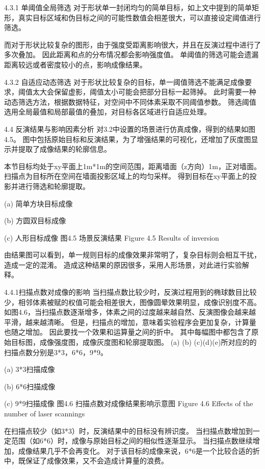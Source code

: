 4.3.1 单阈值全局筛选
对于形状单一封闭均匀的简单目标，如上文中提到的简单矩形，真实目标区域和伪目标之间的可能性数值会相差很大，可以直接设定阈值进行筛选。

而对于形状比较复杂的图形，由于强度受距离影响很大，并且在反演过程中进行了多次叠加。
因此距离和点的分布情况都会影响强度值。
单阈值的筛选可能会遗漏距离较远或者密度较小的点，影响成像结果。

4.3.2 自适应动态筛选
对于形状比较复杂的目标，单一阈值筛选不能满足成像要求，阈值太大会保留虚影，阈值太小可能会把部分目标一起筛掉。
此时需要一种动态筛选方法，根据数据特征，对空间中不同体素采取不同阈值参数。
筛选阈值选用全局最值和局部最值的叠加，对目标各区域进行自适应处理。

4.4  反演结果与影响因素分析
对3.2中设置的场景进行仿真成像，得到的结果如图4.5。
图中包括原始目标和反演结果，为了增强结果的可视化，还增加了灰度图显示并提取了成像结果的轮廓信息。

本节目标均处于xy平面上1m*1m的空间范围，距离墙面（z方向）1m，正对墙面。
扫描点为目标所在空间在墙面投影区域上的均匀采样。
得到目标在xy平面上的投影并进行筛选和轮廓提取。

 
(a) 简单方块目标成像
 
(b) 方圆双目标成像
 
(c) 人形目标成像
图4.5  场景反演结果
Figure 4.5 Results of inversion

由结果图可以看到，单一规则目标的成像效果非常明了，复杂目标则会相互干扰，造成一定的混淆。
造成这种结果的原因很多，采用人形场景，对此进行实验解释。

4.4.1扫描点数对成像的影响
当扫描点数比较少时，反演过程用到的椭球数目比较少，相邻体素被赋的权值可能会相差很大，图像圆晕效果明显，成像识别度不高。
如图4.6，当扫描点数逐渐增多，体素之间的过度越来越自然、反演图像会越来越平滑，越来越清晰。
但是，扫描点的增加，意味着实验程序会更加复杂，计算量也随之增加。
因此要找一个效果和运算量之间的折中。
其中每幅图中都包含了原始目标图，成像强度图，成像灰度图和轮廓提取图。
(a) (b) (c)(d)(e)所对应的的扫描点数分别是3*3，6*6，9*9。


 
(a) 3*3扫描成像
 
(b) 6*6扫描成像

 
(c) 9*9扫描成像
图4.6 扫描点数对成像结果影响示意图
Figure 4.6 Effects of the number of laser scannings 

在扫描点较少（如3*3）时，反演结果中的目标没有辨识度。
当扫描点数增加到一定范围（如6*6）时，成像与原始目标之间的相似性逐渐显示。
当扫描点数继续增加，成像结果几乎不会再变化。
对于该目标的成像来说，6*6是一个比较合适的折中，既保证了成像效果，又不会造成计算量的浪费。

